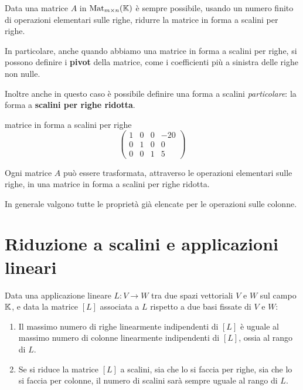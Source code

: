 \begin{theorem}
	Data una matrice $A$ in $\operatorname{Mat}_{m \times n}(\mathbb{K})$ è sempre possibile,
	usando un numero finito di operazioni elementari sulle righe, ridurre la
	matrice in forma a scalini per righe.
\end{theorem}

In particolare, anche quando abbiamo una matrice in forma a scalini per righe, si
possono definire i \textbf{pivot} della matrice, come i coefficienti più a
sinistra delle righe non nulle.

Inoltre anche in questo caso è possibile definire una forma a scalini
\emph{particolare}: la forma a \textbf{scalini per righe ridotta}.

\begin{example}
	matrice in forma a scalini per righe
	\[
		\begin{pmatrix}
			1 & 0 & 0 & -20 \\
			0 & 1 & 0 & 0   \\
			0 & 0 & 1 & 5
		\end{pmatrix}
	\]
\end{example}

\begin{corollary}
	Ogni matrice $A$ può essere trasformata, attraverso le operazioni elementari
	sulle righe, in una matrice in forma a scalini per righe ridotta.
\end{corollary}

In generale valgono tutte le proprietà già elencate per le operazioni sulle
colonne.

\section{Riduzione a scalini e applicazioni lineari}

\begin{theorem}
	Data una applicazione lineare $L : V \to W$ tra due spazi vettoriali $V$ e
	$W$ sul campo $\mathbb{K}$, e data la matrice $[L]$ associata a $L$ rispetto
	a due basi fissate di $V$ e $W$:
	\begin{enumerate}
		\item Il massimo numero di righe linearmente indipendenti di $[L]$ è
		      uguale al massimo numero di colonne linearmente indipendenti di
		      $[L]$, ossia al rango di $L$.
		\item Se si riduce la matrice $[L]$ a scalini, sia che lo si faccia
		      per righe, sia che lo si faccia per colonne, il numero di scalini
		      sarà sempre uguale al rango di $L$.
	\end{enumerate}
\end{theorem}

